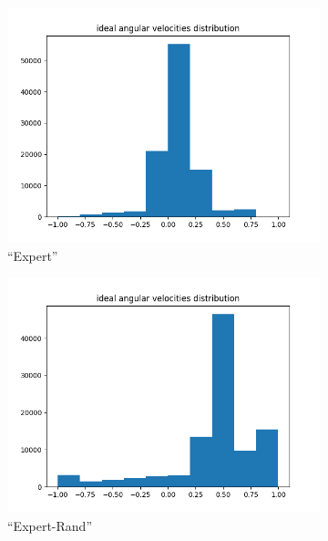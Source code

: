\begin{figure}[H]
	\centering
	\begin{subfigure}[h]{0.4\textwidth}
		\centering
		\includegraphics[width=\linewidth]{kapitel5/images/eval/expert/expert-distr.png}
		\caption{``Expert''}
		\label{expert-drive-val-distr}
	\end{subfigure}%
	\begin{subfigure}[h]{0.4\textwidth}
		\centering
		\includegraphics[width=\linewidth]{kapitel5/images/eval/expert/expert-rand-distr.png}
		\caption{``Expert-Rand''}
		\label{expert-rand-val-distr}
	\end{subfigure}
	\begin{subfigure}[h]{0.4\textwidth}
		\centering

\end{subfigure}
\end{figure}
